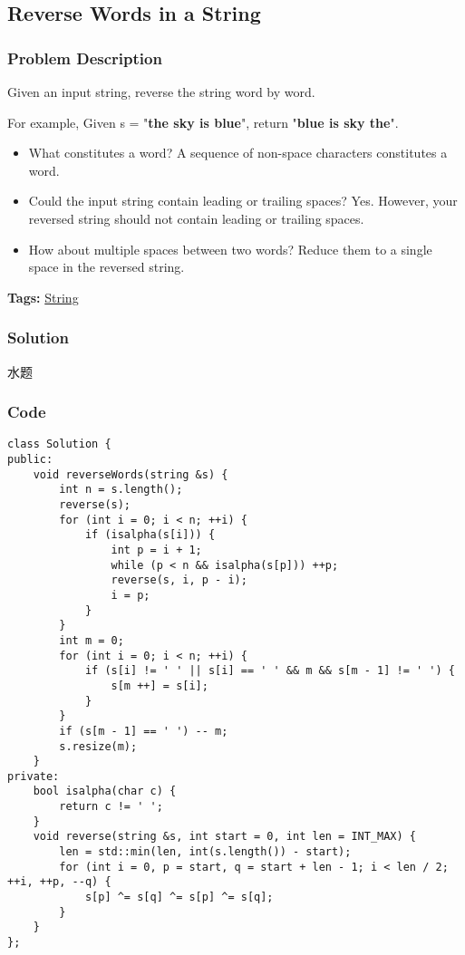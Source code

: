 \documentclass{article}
\begin{document}
\begin{CJK*}{UTF8}{gkai}
\subsection{ Reverse Words in a String }
\label{ Reverse Words in a String }

\subsubsection*{Problem Description}
Given an input string, reverse the string word by word.

For example,
Given s = "\textbf{the sky is blue}",
return "\textbf{blue is sky the}".

\begin{itemize}
\item What constitutes a word?
A sequence of non-space characters constitutes a word.
\item Could the input string contain leading or trailing spaces?
Yes. However, your reversed string should not contain leading or trailing spaces.
\item How about multiple spaces between two words?
Reduce them to a single space in the reversed string.
\end{itemize}


\textbf{Tags: }
\hyperref[ String ]{ String }



\subsubsection*{Solution}
水题

\subsubsection*{Code}
\begin{lstlisting}
class Solution {
public:
    void reverseWords(string &s) {
        int n = s.length();
        reverse(s);
        for (int i = 0; i < n; ++i) {
            if (isalpha(s[i])) {
                int p = i + 1;
                while (p < n && isalpha(s[p])) ++p;
                reverse(s, i, p - i);
                i = p;
            }
        }
        int m = 0;
        for (int i = 0; i < n; ++i) {
            if (s[i] != ' ' || s[i] == ' ' && m && s[m - 1] != ' ') {
                s[m ++] = s[i];
            }
        }
        if (s[m - 1] == ' ') -- m;
        s.resize(m);
    }
private:
    bool isalpha(char c) {
        return c != ' ';
    }
    void reverse(string &s, int start = 0, int len = INT_MAX) {
        len = std::min(len, int(s.length()) - start);
        for (int i = 0, p = start, q = start + len - 1; i < len / 2; ++i, ++p, --q) {
            s[p] ^= s[q] ^= s[p] ^= s[q];
        }
    }
}; 
\end{lstlisting}



\end{CJK*}
\end{document}
